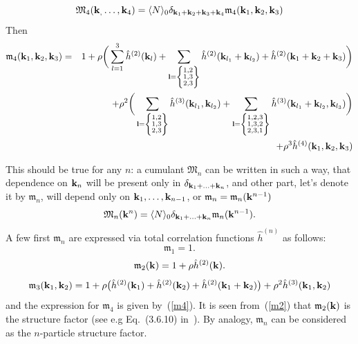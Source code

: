\begin{equation}
\mathfrak M_4(\vb k_, \dotsc, \vb k_4) = \langle N \rangle_0 \delta_{\vb k_1 + \vb k_2 + \vb k_3 + \vb k_4} \mathfrak m_4(\vb k_1, \vb k_2, \vb k_3) 
\end{equation}
Then
\begin{eqnarray}
	\label{m4}
	\mathfrak m_4(\vb k_1, \vb k_2, \vb k_3) &=&  1 + \rho \bigg(
	\sum_{l = 1}^3 \hat{h}^{(2)}(\vb k_l) +
	\sum_{\vb l = \left\{\substack{1,2 \\ 1,3 \\ 2,3} \right\} }  \hat{h}^{(2)} (\vb k_{l_1} + \vb k_{l_2})
	+ \hat{h}^{(2)} (\vb k_1 + \vb k_2 + \vb k_3)
	\bigg)
	\nonumber \\
	&&  + \rho^2 \bigg(
	\sum_{\vb l = \left\{\substack{1,2 \\ 1,3 \\ 2,3 }\right\} }
	\hat{h}^{(3)}(\vb k_{l_1}, \vb k_{l_2})
	+ \sum_{\vb l = \left\{\substack{1,2,3 \\ 1,3,2 \\ 2,3,1}\right\} }
	\hat{h}^{(3)}(\vb k_{l_1} + \vb k_{l_2}, \vb k_{l_3})
	\bigg)
	\nonumber\\
	&& + \rho^3 \hat{h}^{(4)} (\vb k_1, \vb k_2, \vb k_3)
\end{eqnarray}


This should be true for any $n$: a cumulant $\mathfrak M_n$ can be written in such a way, that dependence on $\vb k_n$ will be present only in $\delta_{\vb k_1 + \dotsc + \vb k_n}$, and other part, let's denote it by $\mathfrak m_n$, will depend only on $\vb k_1, \dotsc, \vb k_{n-1}$, or $\mathfrak m_n = \mathfrak m_n(\vb k^{n-1})$
\begin{equation}
	\mathfrak M_n(\vb k^n) = \langle N \rangle_0 \delta_{\vb k_1 + \dotsc + \vb k_n} \mathfrak m_n(\vb k^{n-1}).
\end{equation}
A few first $\mathfrak m_n$ are expressed via total correlation functions $\hat{h}^{(n)}$ as follows:
\begin{equation}
	\mathfrak{m}_1 = 1.
\end{equation}
\begin{equation}
	\label{m2}
	\mathfrak m_2(\vb k) = 1 + \rho \hat{h}^{(2)}(\vb k).
\end{equation}
\begin{equation}
	\label{m3}
	\mathfrak m_3(\vb k_1, \vb k_2) = 1 +  \rho \big(\hat{h}^{(2)}(\vb k_1) + \hat{h}^{(2)}(\vb k_2) + \hat{h}^{(2)}(\vb k_1 + \vb k_2) \big) 
	+ \rho^2 \hat{h}^{(3)}(\vb k_1, \vb k_2)
\end{equation}
and the expression for $\mathfrak m_4$ is given by~(\ref{m4}).
It is seen from~(\ref{m2}) that $\mathfrak m_2(\vb k)$ is the structure factor (see e.g Eq.~(3.6.10) in~\cite{HANSEN2013ch3}). By analogy, $\mathfrak{m}_n$ can be considered as the $n$-particle structure factor.

